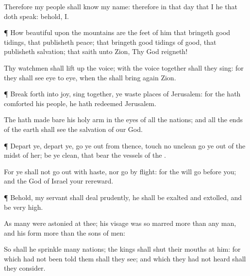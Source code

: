 {Therefore my
people shall
know my
name: therefore
{} in that
day that I
{} he that doth
speak: behold,
{} I.


\par }{\PP {}¶ How
beautiful upon the
mountains are the
feet of him that bringeth good
tidings, that
publisheth
peace; that bringeth good
tidings of
good, that
publisheth
salvation; that
saith unto
Zion, Thy
God
reigneth!

Thy
watchmen shall lift
up the
voice; with the
voice
together shall they
sing: for they shall
see
eye to
eye, when the
{} shall bring
again
Zion.


\par }{\PP {}¶ Break forth into
joy,
sing
together, ye waste
places of
Jerusalem: for the
{} hath
comforted his
people, he hath
redeemed
Jerusalem.

The
{} hath made
bare his
holy
arm in the
eyes of all the
nations; and all the
ends of the
earth shall
see the
salvation of our
God.


\par }{\PP {}¶
Depart ye,
depart ye, go ye
out from thence,
touch no
unclean
{} go ye
out of the
midst of her; be ye
clean, that
bear the
vessels of the
{}.

For ye shall not go
out with
haste, nor
go by
flight: for the
{} will
go
before you; and the
God of
Israel
{} your
rereward.


\par }{\PP {}¶ Behold, my
servant shall deal
prudently, he shall be
exalted and
extolled, and be
very
high.

As
many were
astonied at thee; his
visage was so
marred more than any
man, and his
form more than the
sons of
men:

So shall he
sprinkle
many
nations; the
kings shall
shut their
mouths at him: for
{} which had not been
told them shall they
see; and
{} which they had not
heard shall they
consider.




\par }
